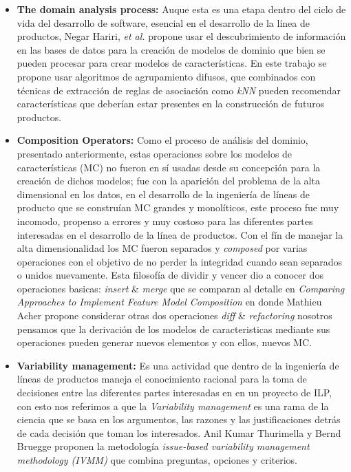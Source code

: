 \begin{itemize}
	\item{ \textbf{The domain analysis process:}}
	Auque esta es una etapa dentro del ciclo de vida del desarrollo de software, esencial en el desarrollo de la línea de productos, Negar Hariri, \textit{et al.}\cite{Hariri2013} propone usar el descubrimiento de información en las bases de datos para la creación de modelos de dominio que bien se pueden procesar para crear modelos de características. En este trabajo se propone usar algoritmos de agrupamiento difusos, que combinados con técnicas de extracción de reglas de asociación como \textit{kNN} pueden recomendar características que deberían estar presentes en la construcción de futuros productos.
	\item{ \textbf{Composition Operators:}}
	Como el proceso de análisis del dominio, presentado anteriormente, estas operaciones sobre los modelos de características (MC) no fueron en sí usadas desde su concepción para la creación de dichos modelos; fue con la aparición del problema de la alta dimensional en los datos, en el desarrollo de la ingeniería de líneas de producto que se construían MC grandes y monolíticos, este proceso fue muy incomodo, propenso a errores y muy costoso para las diferentes partes interesadas en el desarrollo de la línea de productos. Con el fín de manejar la alta dimensionalidad los MC fueron separados y \textit{composed} por varias operaciones con el objetivo de no perder la integridad cuando sean separados o unidos nuevamente. Esta filosofía de dividir y vencer dio a conocer dos operaciones basicas: \textit{insert} \& \textit{merge} que se comparan al detalle en \textit{Comparing Approaches to Implement Feature Model Composition}\cite{Acher2010} en donde Mathieu Acher propone considerar otras dos operaciones \textit{diff} \& \textit{refactoring} nosotros pensamos que la derivación de los modelos de caracteristicas mediante sus operaciones pueden generar nuevos elementos y con ellos, nuevos MC.
	\item{ \textbf{Variability management:}}
	Es una actividad que dentro de la ingeniería de líneas de productos maneja el conocimiento racional para la toma de decisiones entre las diferentes partes interesadas en en un proyecto de ILP, con esto nos referimos a que la \textit{Variability management} es una rama de la ciencia que se basa en los argumentos, las razones y las justificaciones detrás de cada decisión que toman los interesados. Anil Kumar Thurimella y  Bernd  Bruegge proponen la metodología \textit{issue-based variability management methodology (IVMM)}\cite{Thurimella2012} que combina preguntas, opciones y criterios.

\end{itemize}
